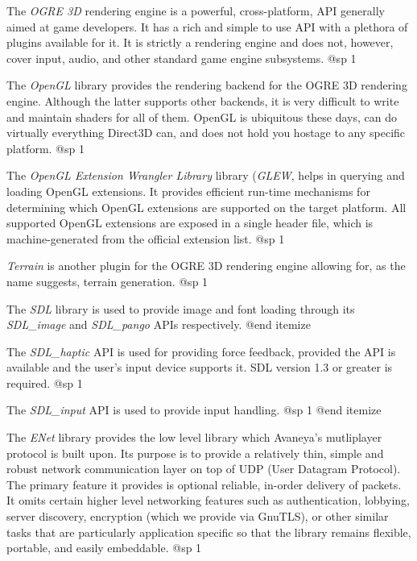 \item
The {\it OGRE 3D} rendering engine is a powerful, cross-platform, API generally aimed at game developers. It has a rich and simple to use API with a plethora of plugins available for it. It is strictly a rendering engine and does not, however, cover input, audio, and other standard game engine subsystems.
@sp 1

\item
The {\it OpenGL} library provides the rendering backend for the OGRE 3D rendering engine. Although the latter supports other backends, it is very difficult to write and maintain shaders for all of them. OpenGL is ubiquitous these days, can do virtually everything Direct3D can, and does not hold you hostage to any specific platform.
@sp 1

\item
The {\it OpenGL Extension Wrangler Library} library ({\it GLEW}, helps in querying and loading OpenGL extensions. It provides efficient run-time mechanisms for determining which OpenGL extensions are supported on the target platform. All supported OpenGL extensions are exposed in a single header file, which is machine-generated from the official extension list.
@sp 1

\item
{\it Terrain} is another plugin for the OGRE 3D rendering engine allowing for, as the name suggests, terrain generation.
@sp 1

\item
The {\it SDL} library is used to provide image and font loading through its {\it SDL_image} and {\it SDL_pango} APIs respectively.
@end itemize


\itemize
\item
The {\it SDL_haptic} API is used for providing force feedback, provided the API is available and the user's input device supports it. SDL version 1.3 or greater is required.
@sp 1

\item
The {\it SDL_input} API is used to provide input handling.
@sp 1
@end itemize


\itemize
\item
The {\it ENet} library provides the low level library which Avaneya's mutliplayer protocol is built upon. Its purpose is to provide a relatively thin, simple and robust network communication layer on top of UDP (User Datagram Protocol). The primary feature it provides is optional reliable, in-order delivery of packets. It omits certain higher level networking features such as authentication, lobbying, server discovery, encryption (which we provide via GnuTLS), or other similar tasks that are particularly application specific so that the library remains flexible, portable, and easily embeddable.
@sp 1

